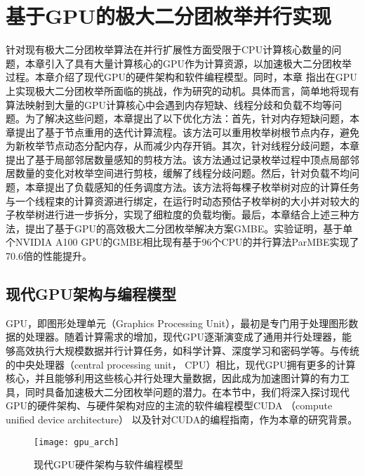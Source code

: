 \chapter{基于GPU的极大二分团枚举并行实现}
\label{ch:gmbe}

针对现有极大二分团枚举算法在并行扩展性方面受限于CPU计算核心数量的问题，本章引入了具有大量计算核心的GPU作为计算资源，以加速极大二分团枚举过程。本章介绍了现代GPU的硬件架构和软件编程模型。同时，本章%
指出在GPU上实现极大二分团枚举所面临的挑战，作为研究的动机。具体而言，简单地将现有算法映射到大量的GPU计算核心中会遇到内存短缺、线程分歧和负载不均等问题。为了解决这些问题，本章提出了以下优化方法：首先，针对内存短缺问题，本章提出了基于节点重用的迭代计算流程。该方法可以重用枚举树根节点内存，避免为新枚举节点动态分配内存，从而减少内存开销。其次，针对线程分歧问题，本章提出了基于局部邻居数量感知的剪枝方法。该方法通过记录枚举过程中顶点局部邻居数量的变化对枚举空间进行剪枝，缓解了线程分歧问题。然后，针对负载不均问题，本章提出了负载感知的任务调度方法。该方法将每棵子枚举树对应的计算任务与一个线程束的计算资源进行绑定，在运行时动态预估子枚举树的大小并对较大的子枚举树进行进一步拆分，实现了细粒度的负载均衡。最后，本章结合上述三种方法，提出了基于GPU的高效极大二分团枚举解决方案GMBE。实验证明，基于单个NVIDIA A100 GPU的GMBE相比现有基于96个CPU的并行算法ParMBE实现了70.6倍的性能提升。

\section{现代GPU架构与编程模型} 
\label{sec:gpu_arch}
GPU，即图形处理单元（Graphics Processing Unit），最初是专门用于处理图形数据的处理器。随着计算需求的增加，现代GPU逐渐演变成了通用并行处理器，能够高效执行大规模数据并行计算任务，如科学计算、深度学习和密码学等。与传统的中央处理器（central processing unit， CPU）相比，现代GPU拥有更多的计算核心，并且能够利用这些核心并行处理大量数据，因此成为加速图计算的有力工具，同时具备加速极大二分团枚举问题的潜力。在本节中，我们将深入探讨现代GPU的硬件架构、与硬件架构对应的主流的软件编程模型CUDA （compute unified device architecture） 以及针对CUDA的编程指南，作为本章的研究背景。

\begin{figure} [t]
  \center
    \vspace{0.1in}
		\texttt{[image: gpu\_arch]}
    \vspace{0.1in}
	\caption{现代GPU硬件架构与软件编程模型}
	\label{fig:gpu}
\end{figure}


